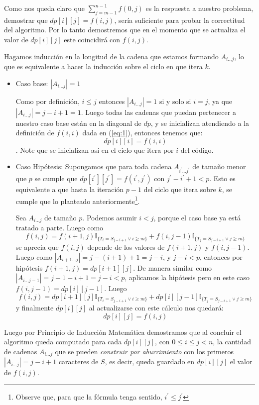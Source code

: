 \documentclass[a4paper]{article}
\begin{document}
	Como nos queda claro que $\sum_{j= m-1}^{n-1}f(0,j)$ es la respuesta a nuestro problema, demostrar que $dp[i][j] = f(i,j)$, sería suficiente para probar la correctitud del algoritmo. Por lo tanto demostremos que en el momento que se actualiza el valor de $dp[i][j]$ este coincidirá con $f(i,j)$.
	
	Hagamos inducción en la longitud de la cadena que estamos formando $A_{i...j}$, lo que es equivalente a hacer la inducción sobre el ciclo en que itera $k$.
	
	\begin{itemize}
		\item Caso base: $|A_{i...j}| = 1$
		
		Como por definición, $i \leq j$ entonces $|A_{i...j}| = 1$ si y solo si $i = j$, ya que $|A_{i...j}| = j-i + 1 = 1$.
		Luego todas las cadenas que puedan pertenecer a nuestro caso base están en la diagonal de $dp$, y se inicializan atendiendo a la definición de $f(i, i)$ dada en (\ref{eq:1}), entonces tenemos que:
		$$dp[i][i] = f(i, i)$$.
		Note que se inicializan así en el ciclo que itera por $i$ del código.
		
		\item Caso Hipótesis: Supongamos que para toda cadena $A_{i^\prime...j^\prime}$ de tamaño menor que $p$ se cumple que $dp[i^\prime][j^\prime] = f(i^\prime, j^\prime)$ con $j^\prime - i^\prime + 1 < p$. Esto es equivalente a que hasta la iteración $p-1$ del ciclo que itera sobre $k$, se cumple que lo planteado anteriormente\footnote{Observe que, para que la fórmula tenga sentido, $i^\prime \leq j^\prime$}.
		
		Sea $A_{i...j}$ de tamaño $p$. Podemos asumir $i<j$, porque el caso base ya está tratado a parte. Luego como
		$$f(i,j) = f(i+1,j)\mathbb{I}_{ \{T_i = S_{j-i+1} \vee i \geq m \}}  +  f(i,j-1)\mathbb{I}_{ \{T_j = S_{j-i+1} \vee j \geq m \} } $$
		se aprecia que $f(i,j)$ depende de los valores de $f(i+1,j)$ y $f(i,j-1)$. Luego como $|A_{i+1...j}| = j-(i+1) + 1 = j-i$, y $j-i < p$, entonces por hipótesis $f(i+1,j) = dp[i+1][j]$. De manera similar como $|A_{i...j-1}| = j-1 - i + 1 = j-i < p$, aplicamos la hipótesis pero en este caso $f(i,j-1) = dp[i][j-1]$.
		Luego
		$$f(i,j) = dp[i+1][j]\mathbb{I}_{ \{T_i = S_{j-i+1} \vee i \geq m \}}  +  dp[i][j-1]\mathbb{I}_{ \{T_j = S_{j-i+1} \vee j \geq m \} } $$
		y finalmente $dp[i][j]$ al actualizarse con este cálculo nos quedará:
		$$dp[i][j] = f(i,j)$$				
	\end{itemize}

	Luego por Principio de Inducción Matemática demostramos que al concluir el algoritmo queda computado para cada $dp[i][j]$, con $0 \leq i\leq j < n$, la cantidad de cadenas $A_{i...j}$ que se pueden \textit{construir por aburrimiento} con los primeros $|A_{i...j}| = j-i+1$ caracteres de $S$, es decir, queda guardado en $dp[i][j]$ el valor de $f(i,j)$.	
	
\end{document}
